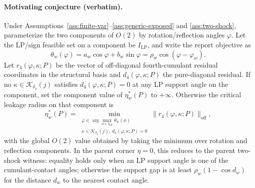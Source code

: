 \paragraph{Motivating conjecture (verbatim).}
Under Assumptions~\ref{ass:finite-var}--\ref{ass:generic-exposed} and \ref{ass:two-shock}, parameterize the two components of \(O(2)\) by rotation/reflection angles \(\varphi\).  Let the LP/sign feasible set on a component be \(I_{\mathrm{LP}}\), and write the report objective as
\[
\theta_w(\varphi)=a_w\cos\varphi+b_w\sin\varphi=\rho_w\cos(\varphi-\varphi_w).
\]
Let \(r_4(\varphi,\kappa;P)\) be the vector of off-diagonal fourth-cumulant residual coordinates in the structural basis and \(d_4(\varphi,\kappa;P)\) the pure-diagonal residual.  If no \(\kappa\in\mathcal K_{\delta_4}(j)\) satisfies \(d_4(\varphi,\kappa;P)=0\) at any LP support angle on the component, set the component value of \(\eta_w^*(P)\) to \(+\infty\).  Otherwise the critical leakage radius on that component is
\[
\eta_w^*(P)=
\min_{\substack{\varphi\in\arg\max_{\phi\in I_{\mathrm{LP}}}\theta_w(\phi)\\
\kappa\in\mathcal K_{\delta_4}(j),\ d_4(\varphi,\kappa;P)=0}}
\|r_4(\varphi,\kappa;P)\|_{\mathrm{off}},
\]
with the global \(O(2)\) value obtained by taking the minimum over rotation and reflection components.  In the parent corner \(\eta=0\), this reduces to the parent two-shock witness: equality holds only when an LP support angle is one of the cumulant-contact angles; otherwise the support gap is at least \(\rho_w(1-\cos d_w)\) for the distance \(d_w\) to the nearest contact angle.

